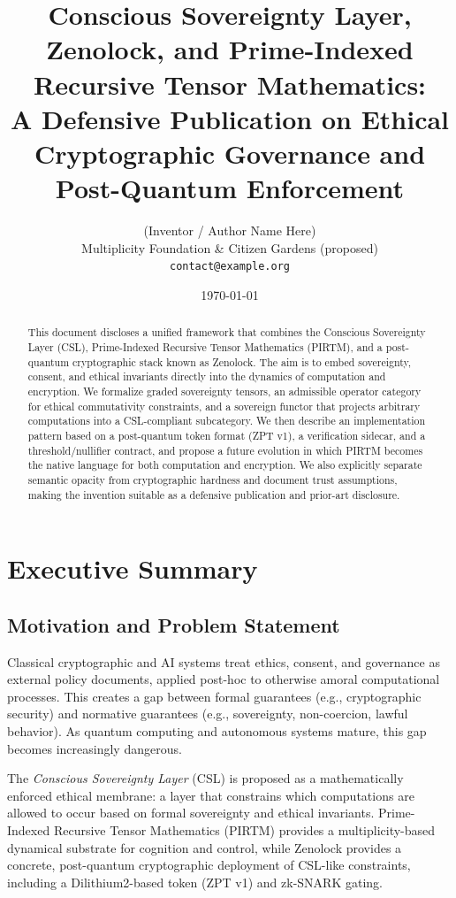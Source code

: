 \documentclass[11pt]{article}
\title{
Conscious Sovereignty Layer, Zenolock, and Prime-Indexed Recursive Tensor Mathematics:\\
A Defensive Publication on Ethical Cryptographic Governance and Post-Quantum Enforcement
}
\author{%
  (Inventor / Author Name Here)\\
  Multiplicity Foundation \& Citizen Gardens (proposed)\\
  \texttt{contact@example.org}
}
\date{\today}
\begin{document}
\maketitle

\begin{abstract}
This document discloses a unified framework that combines the Conscious Sovereignty Layer (CSL), 
Prime-Indexed Recursive Tensor Mathematics (PIRTM), and a post-quantum cryptographic stack known as Zenolock.
The aim is to embed sovereignty, consent, and ethical invariants directly into the dynamics of computation and encryption.
We formalize graded sovereignty tensors, an admissible operator category for ethical commutativity constraints, 
and a sovereign functor that projects arbitrary computations into a CSL-compliant subcategory.
We then describe an implementation pattern based on a post-quantum token format (ZPT v1),
a verification sidecar, and a threshold/nullifier contract, and propose a future evolution in which
PIRTM becomes the native language for both computation and encryption.
We also explicitly separate semantic opacity from cryptographic hardness and document trust assumptions, 
making the invention suitable as a defensive publication and prior-art disclosure.
\end{abstract}

\tableofcontents

\section{Executive Summary}

\subsection{Motivation and Problem Statement}

Classical cryptographic and AI systems treat ethics, consent, and governance as external policy documents,
applied post-hoc to otherwise amoral computational processes.
This creates a gap between formal guarantees (e.g., cryptographic security) and normative guarantees
(e.g., sovereignty, non-coercion, lawful behavior).
As quantum computing and autonomous systems mature, this gap becomes increasingly dangerous.

The \emph{Conscious Sovereignty Layer} (CSL) is proposed as a mathematically enforced ethical membrane:
a layer that constrains which computations are allowed to occur based on formal sovereignty and ethical invariants.
Prime-Indexed Recursive Tensor Mathematics (PIRTM) provides a multiplicity-based dynamical substrate for cognition and control,
while Zenolock provides a concrete, post-quantum cryptographic deployment of CSL-like constraints,
including a Dilithium2-based token (ZPT v1) and zk-SNARK gating.
\end{document}
